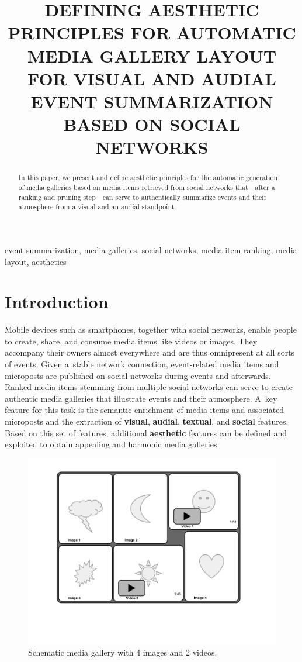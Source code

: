 \documentclass{article}
\title{DEFINING AESTHETIC PRINCIPLES FOR AUTOMATIC MEDIA GALLERY LAYOUT\\
FOR VISUAL AND AUDIAL EVENT SUMMARIZATION BASED ON SOCIAL NETWORKS}
\let\oldsection\section
\renewcommand{\section}[1]{\oldsection{#1}\vspace{-1em}}
\begin{document}
\maketitle

\begin{abstract}
In this paper, we present and define aesthetic principles
for the automatic generation of media galleries
based on media items retrieved from social networks
that---after a ranking and pruning step---can serve to authentically
summarize events and their atmosphere from a visual
and an audial standpoint.
\end{abstract}

\begin{keywords}
event summarization, media galleries, social networks,
media item ranking, media layout, aesthetics
\end{keywords}

\section{Introduction}
Mobile devices such as smartphones, together with social networks,
enable people to create, share, and consume media items
like videos or images.
They accompany their owners almost everywhere
and are thus omnipresent at all sorts of events.
Given a~stable network connection, event-related media items
and microposts are published on social networks
during events and afterwards.
Ranked media items stemming from multiple social networks
can serve to create authentic media galleries
that illustrate events and their atmosphere.
A~key feature for this task is the semantic enrichment
of media items and associated microposts
and the extraction of \textbf{visual}, \textbf{audial},
\textbf{textual}, and \textbf{social} features.
Based on this set of features,
additional \textbf{aesthetic} features
can be defined and exploited to obtain appealing
and harmonic media galleries.

\begin{figure}[htb]
\centering
\includegraphics[trim=20mm 40mm 20mm 10mm, clip, width=0.75\columnwidth]{media-gallery.pdf}
\caption{Schematic media gallery with 4 images and 2 videos.}
\label{fig:media-gallery}
\end{figure}
\end{document}
